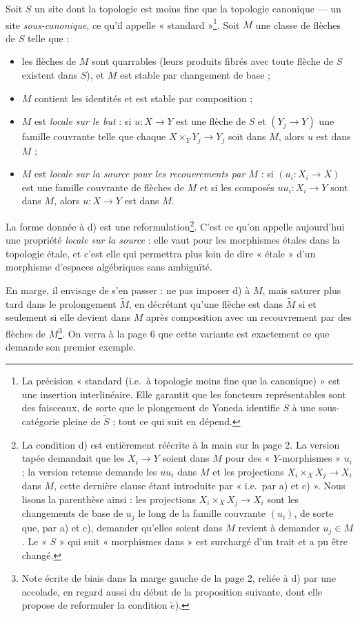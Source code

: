 \documentclass[11pt,a4paper]{article}
\begin{document}
Soit $S$ un site dont la topologie est moins fine que la topologie canonique
— un site \emph{sous-canonique}, ce qu'il appelle « standard »\footnote{La
précision « standard (i.e.\ à topologie moins fine que la canonique) » est une
insertion interlinéaire. Elle garantit que les foncteurs représentables sont
des faisceaux, de sorte que le plongement de Yoneda identifie $S$ à une
sous-catégorie pleine de $\widetilde{S}$ ; tout ce qui suit en dépend.}. Soit
$M$ une classe de flèches de $S$ telle que :

\begin{itemize}
  \item[a)] les flèches de $M$ sont quarrables (leurs produits fibrés avec
    toute flèche de $S$ existent dans $S$), et $M$ est stable par changement de
    base ;
  \item[b)] $M$ contient les identités et est stable par composition ;
  \item[c)] $M$ est \emph{locale sur le but} : si $u : X \to Y$ est une flèche
    de $S$ et $(Y_j \to Y)$ une famille couvrante telle que chaque
    $X \times_Y Y_j \to Y_j$ soit dans $M$, alors $u$ est dans $M$ ;
  \item[d)] $M$ est \emph{locale sur la source pour les recouvrements par
    $M$} : si $(u_i : X_i \to X)$ est une famille couvrante de flèches de $M$
    et si les composés $u u_i : X_i \to Y$ sont dans $M$, alors $u : X \to Y$ est
    dans $M$.
\end{itemize}

La forme donnée à d) est une reformulation\footnote{La condition d) est
entièrement réécrite à la main sur la page 2. La version tapée demandait que les
$X_i \to Y$ soient dans $M$ pour des « $Y$-morphismes » $u_i$ ; la version
retenue demande les $u u_i$ dans $M$ et les projections
$X_i \times_X X_j \to X_i$ dans $M$, cette dernière clause étant introduite par
« i.e.\ par a) et c) ». Nous lisons la parenthèse ainsi : les projections
$X_i \times_X X_j \to X_i$ sont les changements de base de $u_j$ le long de la
famille couvrante $(u_i)$, de sorte que, par a) et c), demander qu'elles soient
dans $M$ revient à demander $u_j \in M$. Le « $S$ » qui suit « morphismes dans »
est surchargé d'un trait et a pu être changé.}. C'est ce qu'on appelle
aujourd'hui une propriété \emph{locale sur la source} : elle vaut pour les
morphismes étales dans la topologie étale, et c'est elle qui permettra plus loin
de dire « étale » d'un morphisme d'espaces algébriques sans ambiguïté.

En marge, il envisage de s'en passer : ne pas imposer d) à $M$, mais saturer
plus tard dans le prolongement $\widetilde{M}$, en décrétant qu'une flèche est
dans $\widetilde{M}$ si et seulement si elle devient dans $M$ après composition
avec un recouvrement par des flèches de $M$\footnote{Note écrite de biais dans la
marge gauche de la page 2, reliée à d) par une accolade, en regard aussi du
début de la proposition suivante, dont elle propose de reformuler la condition
$\tilde{e}$).}. On verra à la page 6 que cette variante est exactement ce que
demande son premier exemple.
\end{document}

